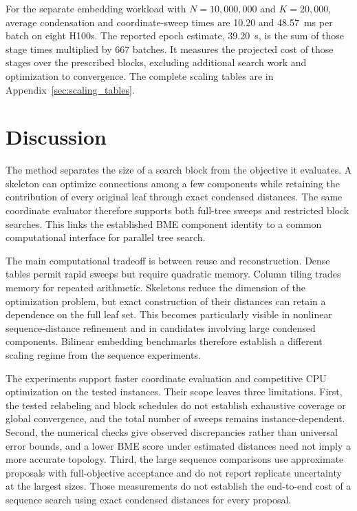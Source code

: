 \documentclass[11pt,a4paper]{article}
\makeatletter
\DeclareRobustCommand{\_}{\ifmmode\nfss@text{\textunderscore}\else\textunderscore\allowbreak\fi}
\theoremstyle{definition}
\makeatother
\begin{document}
For the separate embedding workload with $N=10{,}000{,}000$ and $K=20{,}000$, average condensation and coordinate-sweep times are 10.20 and 48.57~ms per batch on eight H100s.
The reported epoch estimate, 39.20~s, is the sum of those stage times multiplied by 667 batches.
It measures the projected cost of those stages over the prescribed blocks, excluding additional search work and optimization to convergence.
The complete scaling tables are in Appendix~\ref{sec:scaling_tables}.

\section{Discussion}

The method separates the size of a search block from the objective it evaluates.
A skeleton can optimize connections among a few components while retaining the contribution of every original leaf through exact condensed distances.
The same coordinate evaluator therefore supports both full-tree sweeps and restricted block searches.
This links the established BME component identity to a common computational interface for parallel tree search.

The main computational tradeoff is between reuse and reconstruction.
Dense tables permit rapid sweeps but require quadratic memory.
Column tiling trades memory for repeated arithmetic.
Skeletons reduce the dimension of the optimization problem, but exact construction of their distances can retain a dependence on the full leaf set.
This becomes particularly visible in nonlinear sequence-distance refinement and in candidates involving large condensed components.
Bilinear embedding benchmarks therefore establish a different scaling regime from the sequence experiments.

The experiments support faster coordinate evaluation and competitive CPU optimization on the tested instances.
Their scope leaves three limitations.
First, the tested relabeling and block schedules do not establish exhaustive coverage or global convergence, and the total number of sweeps remains instance-dependent.
Second, the numerical checks give observed discrepancies rather than universal error bounds, and a lower BME score under estimated distances need not imply a more accurate topology.
Third, the large sequence comparisons use approximate proposals with full-objective acceptance and do not report replicate uncertainty at the largest sizes.
Those measurements do not establish the end-to-end cost of a sequence search using exact condensed distances for every proposal.
\end{document}
